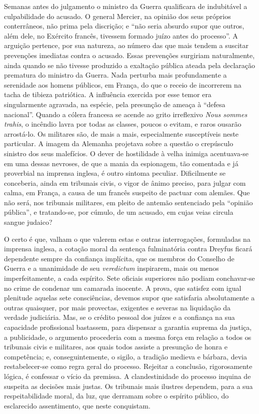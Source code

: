 Semanas antes do julgamento o ministro da Guerra qualificara de
indubitável a culpabilidade do acusado. O general Mercier, na opinião
dos seus próprios conterrâneos, não prima pela discrição; e
``não seria absurdo supor que outros, além dele, no
Exército francês, tivessem formado juízo antes do
processo''. A arguição pertence, por sua natureza, ao
número das que mais tendem a suscitar prevenções imediatas contra o
acusado. Essas prevenções surgiriam naturalmente, ainda quando se não
tivesse produzido a exaltação pública ateada pela declaração prematura
do ministro da Guerra. Nada perturba mais profundamente a serenidade
aos homens públicos, em França, do que o receio de incorrerem na tacha
de tibieza patriótica. A influência exercida por esse temor era
singularmente agravada, na espécie, pela presunção de ameaça à
``defesa nacional''. Quando a cólera francesa
se acende ao grito irreflexivo \textit{Nous sommes trahis}, o incêndio lavra por
todas as classes, poucos o evitam, e raros ousarão arrostá-lo. Os
militares são, de mais a mais, especialmente susceptíveis neste
particular. A imagem da Alemanha projetava sobre a questão o crepúsculo
sinistro dos seus malefícios. O dever de hostilidade à velha inimiga
acentuava-se em uma dessas nevroses, de que a mania da espionagem,
tão comentada e já proverbial na imprensa inglesa, é outro sintoma
peculiar. Dificilmente se conceberia, ainda em tribunais civis, o vigor
de ânimo preciso, para julgar com calma, em França, a causa de um
francês suspeito de pactuar com alemães. Que não será, nos tribunais
militares, em pleito de antemão sentenciado pela ``opinião
pública'', e tratando-se, por cúmulo, de um acusado, em
cujas veias circula sangue judaico?

O certo é que, valham o que valerem estas e outras interrogações,
formuladas na imprensa inglesa, a cotação moral da sentença
fulminatória contra Dreyfus ficará dependente sempre da confiança
implícita, que os membros do Conselho de Guerra e a unanimidade de seu
\textit{veredictum} inspirarem, mais ou menos imperfeitamente, a cada espírito.
Sete oficiais superiores não podiam conchavar-se no crime de condenar
um camarada inocente. A prova, que satisfez com igual plenitude aquelas
sete consciências, devemos supor que satisfaria absolutamente a outras
quaisquer, por mais provectas, exigentes e severas na liquidação da
verdade judiciária. Mas, se o crédito pessoal dos juízes e a confiança
na sua capacidade profissional bastassem, para dispensar a garantia
suprema da justiça, a publicidade, o argumento procederia com a mesma
força em relação a todos os tribunais civis e militares, aos quais
todos assiste a presunção de honra e competência; e, conseguintemente,
o sigilo, a tradição medieva e bárbara, devia restabelecer-se como
regra geral do processo. Rejeitar a conclusão, rigorosamente lógica, é
confessar o vício da premissa. A clandestinidade do processo inquina de
suspeita as decisões mais justas. Os tribunais mais ilustres dependem,
para a sua respeitabilidade moral, da luz, que derramam sobre o
espírito público, do esclarecido assentimento, que neste conquistam.

